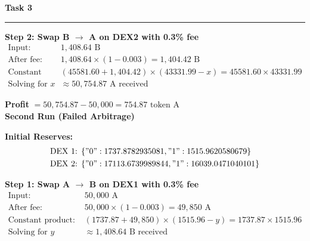 \documentclass[a4paper]{article}
\newenvironment{solution}[2][]{%
\begin{mdframed}[linecolor=blue!70!black, linewidth=2pt, roundcorner=10pt, backgroundcolor=yellow!10!white, skipabove=12pt, skipbelow=12pt]%
	\textbf{\large #2}
	\par\noindent\rule{\textwidth}{0.4pt}
}{
\end{mdframed}
}
\begin{document}
\begin{solution}{Task 3}
	\textbf{Step 2: Swap B $\rightarrow$ A on DEX2 with 0.3\% fee}
	\begin{align*}
	\text{Input: } &1,408.64 \text{ B}\\
	\text{After fee: } &1,408.64 \times (1 - 0.003) = 1,404.42 \text{ B}\\
	\text{Constant product: } &(45581.60 + 1,404.42) \times (43331.99 - x) = 45581.60 \times 43331.99\\
	\text{Solving for } x &\approx 50,754.87 \text{ A received}
	\end{align*}
	
	\textbf{Profit} $= 50,754.87 - 50,000 = 754.87 \text{ token A}$\\
	
\textbf{Second Run (Failed Arbitrage)}

	\begin{figure}[H]
		\centering
	\end{figure}


	\textbf{Initial Reserves:}
	\begin{align*}
	\text{DEX 1: } &\{"0":1737.8782935081, "1":1515.9620580679\}\\
	\text{DEX 2: } &\{"0":17113.6739989844, "1":16039.0471040101\}
	\end{align*}
	
	\textbf{Step 1: Swap A $\rightarrow$ B on DEX1 with 0.3\% fee}
	\begin{align*}
	\text{Input: } &50,000 \text{ A}\\
	\text{After fee: } &50,000 \times (1 - 0.003) = 49,850 \text{ A}\\
	\text{Constant product: } &(1737.87 + 49,850) \times (1515.96 - y) = 1737.87 \times 1515.96\\
	\text{Solving for } y &\approx 1,408.64 \text{ B received}
	\end{align*}
	

\end{solution}
\end{document}
